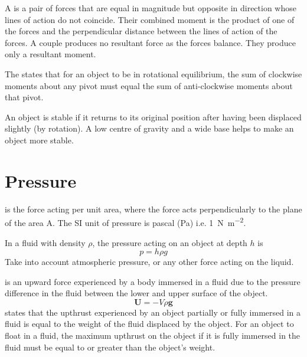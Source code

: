 \documentclass[Physics.tex]{subfiles}
\begin{document}
A  is a pair of forces that are equal in magnitude but opposite in direction whose lines of action do not coincide. Their combined moment is the product of one of the forces and the perpendicular distance between the lines of action of the forces. A couple produces no resultant force as the forces balance. They produce only a resultant moment.

The  states that for an object to be in rotational equilibrium, the sum of clockwise moments about any pivot must equal the sum of anti-clockwise moments about that pivot.

An object is stable if it returns to its original position after having been displaced slightly (by rotation). A low centre of gravity and a wide base helps to make an object more stable.
\section{Pressure}
 is the force acting per unit area, where the force acts perpendicularly to the plane of the area A. The SI unit of pressure is pascal (\si{\pascal}) i.e. \SI{1}{\newton\per\square\metre}.

In a fluid with density \(\rho\), the pressure acting on an object at depth \(h\) is \begin{equation}p = h\rho g\end{equation} Take into account atmospheric pressure, or any other force acting on the liquid.

 is an upward force experienced by a body immersed in a fluid due to the pressure difference in the fluid between the lower and upper surface of the object. \begin{equation}\mathbf{U} = -V\rho \mathbf{g}\end{equation}  states that the upthrust experienced by an object partially or fully immersed in a fluid is equal to the weight of the fluid displaced by the object. For an object to float in a fluid, the maximum upthrust on the object if it is fully immersed in the fluid must be equal to or greater than the object's weight.
\end{document}
